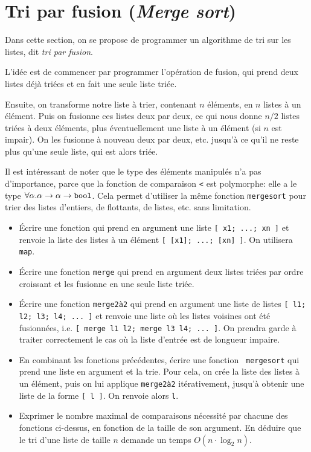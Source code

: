 \documentclass[11pt,a4paper]{article}
\begin{document}
\section{Tri par fusion (\emph{Merge sort})}

Dans cette section, on se propose de programmer un algorithme de tri
sur les listes, dit \emph{tri par fusion}.

L'idée est de commencer par programmer l'opération de fusion, qui
prend deux listes déjà triées et en fait une seule liste triée.

Ensuite, on transforme notre liste à trier, contenant $n$ éléments, en
$n$ listes à un élément. Puis on fusionne ces listes deux par deux, ce
qui nous donne $n/2$ listes triées à deux éléments, plus
éventuellement une liste à un élément (si $n$ est impair). On les
fusionne à nouveau deux par deux, etc. jusqu'à ce qu'il ne reste plus
qu'une seule liste, qui est alors triée.

Il est intéressant de noter que le type des éléments manipulés n'a pas
d'importance, parce que la fonction de comparaison \verb+<+ est
polymorphe: elle a le type
$\forall\alpha.\alpha\rightarrow\alpha\rightarrow\verb+bool+$.  Cela
permet d'utiliser la même fonction \verb+mergesort+ pour trier des
listes d'entiers, de flottants, de listes, etc. sans limitation.

\begin{itemize}
\item \'{E}crire une fonction qui prend en argument une liste
      \verb+[ x1; ...; xn ]+ et renvoie la liste des listes à un
      élément \verb+[ [x1]; ...; [xn] ]+. On utilisera {\tt map}.
\item \'{E}crire une fonction {\tt merge} qui prend en argument deux
      listes triées par ordre croissant et les fusionne en une seule
      liste triée.
\item \'{E}crire une fonction {\tt merge2à2} qui prend en argument une
      liste de listes \verb+[ l1; l2; l3; l4; ... ]+ et renvoie une
      liste où les listes voisines ont été fusionnées, i.e.
      \verb+[ merge l1 l2; merge l3 l4; ... ]+. On prendra garde à
      traiter correctement le cas où la liste d'entrée est de longueur
      impaire.
\item En combinant les fonctions précédentes, écrire une fonction {\tt
      mergesort} qui prend une liste en argument et la trie. Pour
      cela, on crée la liste des listes à un élément, puis on lui
      applique {\tt merge2à2} itérativement, jusqu'à obtenir une liste
      de la forme \verb+[ l ]+. On renvoie alors \verb+l+.
\item Exprimer le nombre maximal de comparaisons nécessité par chacune
      des fonctions ci-dessus, en fonction de la taille de son
      argument. En déduire que le tri d'une liste de taille $n$
      demande un temps $O(n \cdot \log_2 n)$.
\end{itemize}
\end{document}
